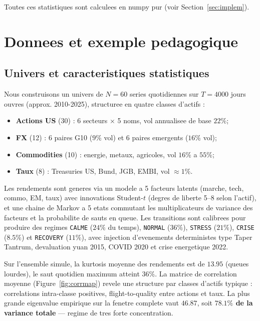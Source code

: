 \documentclass[11pt,a4paper]{article}
\begin{document}
Toutes ces statistiques sont calculees en numpy pur (voir Section~\ref{sec:implem}).

\section{Donnees et exemple pedagogique}
\label{sec:simple}

\subsection{Univers et caracteristiques statistiques}

Nous construisons un univers de $N = 60$ series quotidiennes sur $T = 4000$ jours ouvres (approx. 2010-2025), structuree en quatre classes d'actifs :
\begin{itemize}[leftmargin=*]
\item \textbf{Actions US} (30) : 6 secteurs $\times$ 5 noms, vol annualisee de base $22\%$;
\item \textbf{FX} (12) : 6 paires G10 ($9\%$ vol) et 6 paires emergents ($16\%$ vol);
\item \textbf{Commodities} (10) : energie, metaux, agricoles, vol $16\%$ a $55\%$;
\item \textbf{Taux} (8) : Treasuries US, Bund, JGB, EMBI, vol $\approx 1\%$.
\end{itemize}

Les rendements sont generes via un modele a 5 facteurs latents (marche, tech, commo, EM, taux) avec innovations Student-$t$ (degres de liberte 5--8 selon l'actif), et une chaine de Markov a 5 etats commutant les multiplicateurs de variance des facteurs et la probabilite de sauts en queue. Les transitions sont calibrees pour produire des regimes \texttt{CALME} ($24\%$ du temps), \texttt{NORMAL} ($36\%$), \texttt{STRESS} ($21\%$), \texttt{CRISE} ($8.5\%$) et \texttt{RECOVERY} ($11\%$), avec injection d'evenements deterministes type Taper Tantrum, devaluation yuan 2015, COVID 2020 et crise energetique 2022.

Sur l'ensemble simule, la kurtosis moyenne des rendements est de $\mathbf{13.95}$ (queues lourdes), le saut quotidien maximum atteint $36\%$. La matrice de correlation moyenne (Figure~\ref{fig:corrmap}) revele une structure par classes d'actifs typique : correlations intra-classe positives, flight-to-quality entre actions et taux. La plus grande eigenvalue empirique sur la fenetre complete vaut $46.87$, soit \textbf{$78.1\%$ de la variance totale} --- regime de tres forte concentration.
\end{document}
